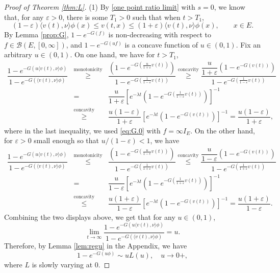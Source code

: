 \documentclass[12pt,a4paper]{amsart}
\numberwithin{equation}{section}
\theoremstyle{plain}
\theoremstyle{definition}
\theoremstyle{remark}
\begin{document}
\begin{proof}[Proof of Theorem \ref{thm:L}]
(1) By \eqref{one point ratio limit} with $s=0$, we know that, for any $\varepsilon>0$, there is some $T_1>0$ such that when $t>T_1$,
\[
(1-\varepsilon)\langle v(t),\nu\rangle \phi(x)\leq v(t,x)\leq (1+\varepsilon)\langle v(t),\nu\rangle \phi(x),\qquad x\in E.
\]
By Lemma \ref{prop:G},  $1-e^{-G(f)}$ is non-decreasing  with respect to $f\in \mathcal B(E,[0,\infty])$, and $1-e^{-G(uf)}$ is a concave function of $u\in(0,1)$.
Fix an arbitrary $u\in (0, 1)$.
On one hand, we have for $t>T_1$,
\begin{eqnarray}\label{lower}
\dfrac{1-e^{-G(u\langle v(t),\nu\rangle \phi)}}{1-e^{-G(\langle v(t),\nu\rangle \phi)}}&\overset{\text{monotonicity}}\geq& \dfrac{\left(1-e^{-G(\frac{u}{1+\varepsilon}v(t))}\right)}{1-e^{-G(\frac{1}{1-\varepsilon} v(t))}}
\overset{\text{concavity}}\geq \dfrac{\dfrac{u}{1+\varepsilon}\left(1-e^{-G(v(t))}\right)}{1-e^{-G(\frac{1}{1-\varepsilon} v(t))}}
\\
&=&\dfrac{u}{1+\varepsilon}\left[e^{-\lambda t}\left(1-e^{-G(\frac{1}{1-\varepsilon} v(t))}\right)\right]^{-1}\nonumber\\
&\overset{\text{concavity}}\geq& \dfrac{u(1-\varepsilon)}{1+\varepsilon}\left[e^{-\lambda t}\left(1-e^{-G(v(t))}\right)\right]^{-1}=\dfrac{u(1-\varepsilon)}{1+\varepsilon},
\end{eqnarray}
where in the last inequality, we used \eqref{eq:G.0} with $f=\infty I_{E}.$
On the other hand,
for $\varepsilon>0$ small enough so that $u/(1-\varepsilon)<1$, we have
\begin{eqnarray}\label{upper}
\dfrac{1-e^{-G(u\langle v(t),\nu\rangle \phi)}}{1-e^{-G(\langle v(t),\nu\rangle \phi)}}&\overset{\text{monotonicity}}\leq &\dfrac{\left(1-e^{-G(\frac{u}{1-\epsilon}v(t))}\right)}{1-e^{-G(\frac{1}{1+\varepsilon} v(t))}}\overset{\text{concavity}}\leq \dfrac{\dfrac{u}{1-\varepsilon}\left(1-e^{-G(v(t))}\right)}{1-e^{-G(\frac{1}{1+\varepsilon} v(t))}}\\
&=&\dfrac{u}{1-\varepsilon}\left[e^{-\lambda t}\left(1-e^{-G(\frac{1}{1+\varepsilon} v(t))}\right)\right]^{-1}\\
 &\overset{\text{concavity}}\leq& \dfrac{u(1+\varepsilon)}{1-\varepsilon}\left[e^{-\lambda t}\left(1-e^{-G(v(t))}\right)\right]^{-1}
=\dfrac{u(1+\varepsilon)}{1-\varepsilon}.
\end{eqnarray}
Combining the two displays above, we get that for any $u\in (0, 1)$,
\[
\lim_{t\to\infty}\dfrac{1-e^{-G(u\langle v(t),\nu\rangle \phi)}}{1-e^{-G(\langle v(t),\nu\rangle \phi)}}
=u.
\]
Therefore, by Lemma \ref{lem:regu} in the Appendix, we have
\begin{equation}\label{eq regu}
1-e^{-G(u\phi)}\sim uL(u),\quad u\rightarrow 0+,
\end{equation}
where $L$ is slowly varying at $0$.


\end{proof}
\end{document}

